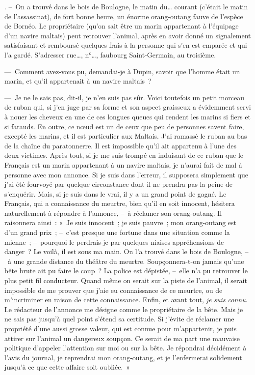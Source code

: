 \documentclass[french,twoside]{book} %
\newenvironment{quoteblock}%
  {\begin{quoting}}
  {\end{quoting}}
\newenvironment{quotebar}{%
    \def\FrameCommand{{\color{rubric!10!}\vrule width 0.5em} \hspace{0.9em}}%
    \def\OuterFrameSep{\itemsep} %
    \MakeFramed {\advance\hsize-\width \FrameRestore}
  }%
  {%
    \endMakeFramed
  }
\renewenvironment{quoteblock}%
  {%
    \savenotes
    \setstretch{0.9}
    \normalfont
    \begin{quotebar}
  }
  {%
    \end{quotebar}
    \spewnotes
  }
\begin{document}
\begin{quoteblock}
. – On a trouvé dans le bois de Boulogne, le matin du… courant (c’était le matin de l’assassinat), de fort bonne heure, un énorme orang-outang fauve de l’espèce de Bornéo. Le propriétaire (qu’on sait être un marin appartenant à l’équipage d’un navire maltais) peut retrouver l’animal, après en avoir donné un signalement satisfaisant et remboursé quelques frais à la personne qui s’en est emparée et qui l’a gardé. S’adresser rue…, n°…, faubourg Saint-Germain, au troisième.
\end{quoteblock}

\noindent — Comment avez-vous pu, demandai-je à Dupin, savoir que l’homme était un marin, et qu’il appartenait à un navire maltais ?\par
— Je ne le sais pas, dit-il, je n’en suis pas sûr. Voici toutefois un petit morceau de ruban qui, si j’en juge par sa forme et son aspect graisseux a évidemment servi à nouer les cheveux en une de ces longues queues qui rendent les marins si fiers et si farauds. En outre, ce nœud est un de ceux que peu de personnes savent faire, excepté les marins, et il est particulier aux Maltais. J’ai ramassé le ruban au bas de la chaîne du paratonnerre. Il est impossible qu’il ait appartenu à l’une des deux victimes. Après tout, si je me suis trompé en induisant de ce ruban que le Français est un marin appartenant à un navire maltais, je n’aurai fait de mal à personne avec mon annonce. Si je suis dans l’erreur, il supposera simplement que j’ai été fourvoyé par quelque circonstance dont il ne prendra pas la peine de s’enquérir. Mais, si je suis dans le vrai, il y a un grand point de gagné. Le Français, qui a connaissance du meurtre, bien qu’il en soit innocent, hésitera naturellement à répondre à l’annonce, – à réclamer son orang-outang. Il raisonnera ainsi : « Je suis innocent ; je suis pauvre ; mon orang-outang est d’un grand prix ; – c’est presque une fortune dans une situation comme la mienne ; – pourquoi le perdrais-je par quelques niaises appréhensions de danger ? Le voilà, il est sous ma main. On l’a trouvé dans le bois de Boulogne, – à une grande distance du théâtre du meurtre. Soupçonnera-t-on jamais qu’une bête brute ait pu faire le coup ? La police est dépistée, – elle n’a pu retrouver le plus petit fil conducteur. Quand même on serait sur la piste de l’animal, il serait impossible de me prouver que j’aie eu connaissance de ce meurtre, ou de m’incriminer en raison de cette connaissance. Enfin, et avant tout, \emph{je suis connu}. Le rédacteur de l’annonce me désigne comme le propriétaire de la bête. Mais je ne sais pas jusqu’à quel point s’étend sa certitude. Si j’évite de réclamer une propriété d’une aussi grosse valeur, qui est connue pour m’appartenir, je puis attirer sur l’animal un dangereux soupçon. Ce serait de ma part une mauvaise politique d’appeler l’attention sur moi ou sur la bête. Je répondrai décidément à l’avis du journal, je reprendrai mon orang-outang, et je l’enfermerai solidement jusqu’à ce que cette affaire soit oubliée. »\par
\end{document}
